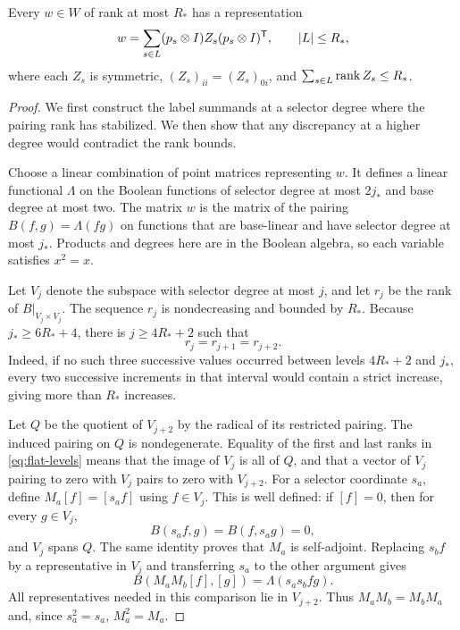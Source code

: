 \begin{lemma}\label{lem:label-support}
Every $w\in W$ of rank at most $R_*$ has a representation
\begin{equation}\label{eq:label-decomposition}
 w=\sum_{s\in L}(p_s\otimes I)Z_s(p_s\otimes I)^{\mathsf T},
 \qquad |L|\le R_*,
\end{equation}
where each $Z_s$ is symmetric, $(Z_s)_{ii}=(Z_s)_{0i}$, and
$\sum_{s\in L}\operatorname{rank} Z_s\le R_*$.
\end{lemma}
\begin{proof}
We first construct the label summands at a selector degree where
the pairing rank has stabilized.  We then show that any discrepancy
at a higher degree would contradict the rank bounds.

Choose a linear combination of point matrices representing $w$.
It defines a linear functional $\Lambda$ on the Boolean functions
of selector degree at most $2j_*$ and base degree at most two.
The matrix $w$ is the matrix of the pairing
$B(f,g)=\Lambda(fg)$ on functions that are base-linear and have
selector degree at most $j_*$.  Products and degrees here are in
the Boolean algebra, so each variable satisfies $x^2=x$.

Let $V_j$ denote the subspace with selector degree at most $j$,
and let $r_j$ be the rank of $B|_{V_j\times V_j}$.  The sequence
$r_j$ is nondecreasing and bounded by $R_*$.  Because
$j_*\ge 6R_*+4$, there is $j\ge4R_*+2$ such that
\begin{equation}\label{eq:flat-levels}
 r_j=r_{j+1}=r_{j+2}.
\end{equation}
Indeed, if no such three successive values occurred between
levels $4R_*+2$ and $j_*$, every two successive increments in
that interval would contain a strict increase, giving more than
$R_*$ increases.

Let $Q$ be the quotient of $V_{j+2}$ by the radical of its
restricted pairing.  The induced pairing on $Q$ is nondegenerate.
Equality of the first and last ranks in \eqref{eq:flat-levels}
means that the image of $V_j$ is all of $Q$, and that a vector of
$V_j$ pairing to zero with $V_j$ pairs to zero with $V_{j+2}$.
For a selector coordinate $s_a$, define $M_a[f]=[s_a f]$ using
$f\in V_j$.  This is well defined: if $[f]=0$, then for every
$g\in V_j$,
\[
 B(s_a f,g)=B(f,s_a g)=0,
\]
and $V_j$ spans $Q$.  The same identity proves that $M_a$ is
self-adjoint.  Replacing $s_bf$ by a representative in $V_j$ and
transferring $s_a$ to the other argument gives
\[
 B(M_aM_b[f],[g])=\Lambda(s_as_bfg).
\]
All representatives needed in this comparison lie in $V_{j+2}$.
Thus $M_aM_b=M_bM_a$ and, since $s_a^2=s_a$, $M_a^2=M_a$.


\end{proof}
